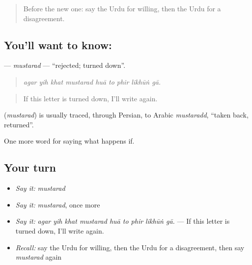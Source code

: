 \label{lesson:UR-C530-mustarad}



\begin{quote}
Before the new one: say the Urdu for willing, then the Urdu for a disagreement.
\end{quote}

\subsection*{You'll want to know: }
\textbf{} — \emph{mustarad} — \textquotedblleft{}rejected; turned down\textquotedblright{}.

\begin{quote}
        
\end{quote}

\begin{quote}
\emph{agar yih khat mustarad huā to phir likhūṅ gā.}
\end{quote}

\begin{quote}
If this letter is turned down, I'll write again.
\end{quote}

\begin{cousinweb}
\textbf{} (\emph{mustarad}) is usually traced, through Persian, to Arabic \emph{mustaradd}, \textquotedblleft{}taken back, returned\textquotedblright{}.
\end{cousinweb}

\begin{grammarlens}[title={What you've built}]
One more word for saying what happens if.
\end{grammarlens}

\subsection*{Your turn}
\begin{itemize}
\raggedright
  \item \emph{Say it:} \emph{mustarad}
  \item \emph{Say it:} \emph{mustarad}, once more
  \item \emph{Say it:} \emph{agar yih khat mustarad huā to phir likhūṅ gā.} — If this letter is turned down, I'll write again.
  \item \emph{Recall:} say the Urdu for willing, then the Urdu for a disagreement, then say \emph{mustarad} again
\end{itemize}

